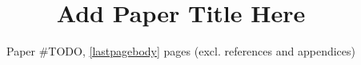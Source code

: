 \documentclass[10pt,sigconf,balance,anonymous,nonacm]{acmart}
\begin{document}
\title{Add Paper Title Here}
\subtitle{Paper \#TODO, \ref{lastpagebody} pages (excl. references and appendices)}







\maketitle


%
%
%
%
%
%

%

\label{lastpagebody}




%

\label{lastpage}
\end{document}
